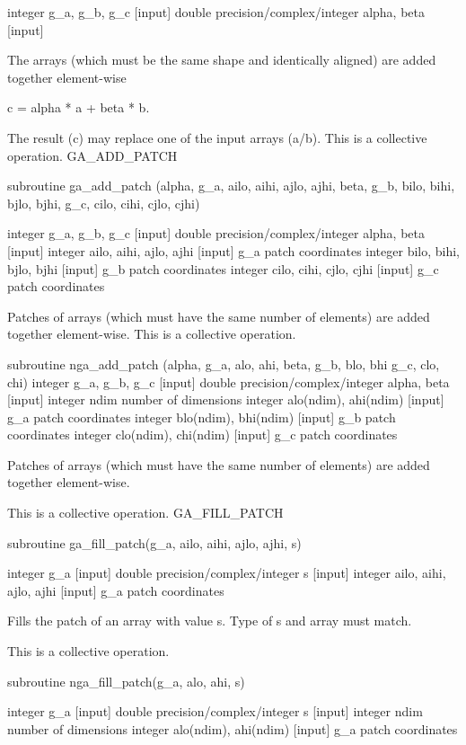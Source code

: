integer g\_a, g\_b, g\_c {[}input{]} double precision/complex/integer
alpha, beta {[}input{]}

The arrays (which must be the same shape and identically aligned)
are added together element-wise

c = alpha {*} a + beta {*} b.

The result (c) may replace one of the input arrays (a/b). This is
a collective operation. GA\_ADD\_PATCH

subroutine ga\_add\_patch (alpha, g\_a, ailo, aihi, ajlo, ajhi, beta,
g\_b, bilo, bihi, bjlo, bjhi, g\_c, cilo, cihi, cjlo, cjhi)

integer g\_a, g\_b, g\_c {[}input{]} double precision/complex/integer
alpha, beta {[}input{]} integer ailo, aihi, ajlo, ajhi {[}input{]}
g\_a patch coordinates integer bilo, bihi, bjlo, bjhi {[}input{]}
g\_b patch coordinates integer cilo, cihi, cjlo, cjhi {[}input{]}
g\_c patch coordinates

Patches of arrays (which must have the same number of elements) are
added together element-wise. This is a collective operation.

subroutine nga\_add\_patch (alpha, g\_a, alo, ahi, beta, g\_b, blo,
bhi g\_c, clo, chi) integer g\_a, g\_b, g\_c {[}input{]} double precision/complex/integer
alpha, beta {[}input{]} integer ndim number of dimensions integer
alo(ndim), ahi(ndim) {[}input{]} g\_a patch coordinates integer blo(ndim),
bhi(ndim) {[}input{]} g\_b patch coordinates integer clo(ndim), chi(ndim)
{[}input{]} g\_c patch coordinates

Patches of arrays (which must have the same number of elements) are
added together element-wise.

This is a collective operation. GA\_FILL\_PATCH

subroutine ga\_fill\_patch(g\_a, ailo, aihi, ajlo, ajhi, s)

integer g\_a {[}input{]} double precision/complex/integer s {[}input{]}
integer ailo, aihi, ajlo, ajhi {[}input{]} g\_a patch coordinates

Fills the patch of an array with value s. Type of s and array must
match.

This is a collective operation.

subroutine nga\_fill\_patch(g\_a, alo, ahi, s)

integer g\_a {[}input{]} double precision/complex/integer s {[}input{]}
integer ndim number of dimensions integer alo(ndim), ahi(ndim) {[}input{]}
g\_a patch coordinates

